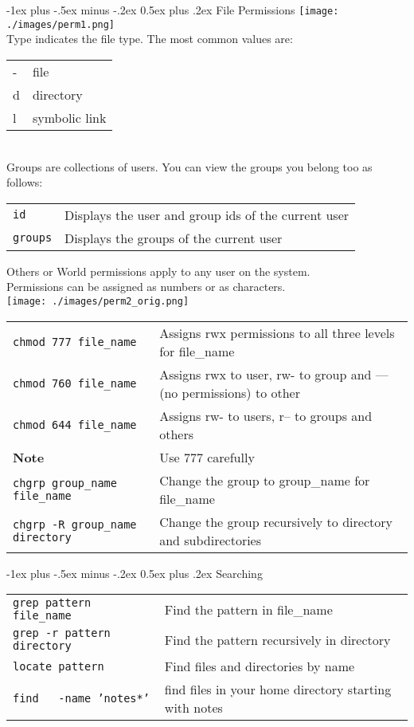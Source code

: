 \documentclass[10pt,landscape]{article}
\makeatletter
\renewcommand{\section}{\@startsection{section}{1}{0mm}%
                                {-1ex plus -.5ex minus -.2ex}%
                                {0.5ex plus .2ex}%
                                {\normalfont\large\bfseries}}
\makeatother
\begin{document}
\begin{multicols}{2}
\section{File Permissions}
\texttt{[image: ./images/perm1.png]} \\
Type indicates the file type. The most common values are: \\ 
\begin{tabular}{@{}ll@{}}
 - & file \\
 d & directory \\
 l & symbolic link
\end{tabular}
\\
Groups are collections of users. You can view the groups you belong too as follows: \\
\begin{tabular}{@{}ll@{}}
 \texttt{id} & Displays the user and group ids of the current user \\
 \texttt{groups} & Displays the groups of the current user
\end{tabular}
Others or World permissions apply to any user on the system. \\
Permissions can be assigned as numbers or as characters. \\
\texttt{[image: ./images/perm2\_orig.png]} \\
\begin{tabular}{@{}ll@{}}
\texttt{chmod 777 file\_name} & Assigns rwx permissions to all three levels for file\_name  \\
\texttt{chmod 760 file\_name} & Assigns rwx to user, rw- to group and --- (no permissions) to other \\
\texttt{chmod 644 file\_name} & Assigns rw- to users, r-- to groups and others \\
\textbf{Note} & Use 777 carefully \\
\texttt{chgrp group\_name file\_name} & Change the group to group\_name for file\_name \\
\texttt{chgrp -R group\_name directory} & Change the group recursively to directory and subdirectories 
\end{tabular}

\section{Searching}
\begin{tabular}{@{}ll@{}}
\texttt{grep pattern file\_name} & Find the pattern in file\_name \\
\texttt{grep -r pattern directory} & Find the pattern recursively in directory \\
\texttt{locate pattern} & Find files and directories by name \\
\texttt{find ~ -name 'notes*'} & find files in your home directory starting with notes
\end{tabular}


\end{multicols}
\end{document}
